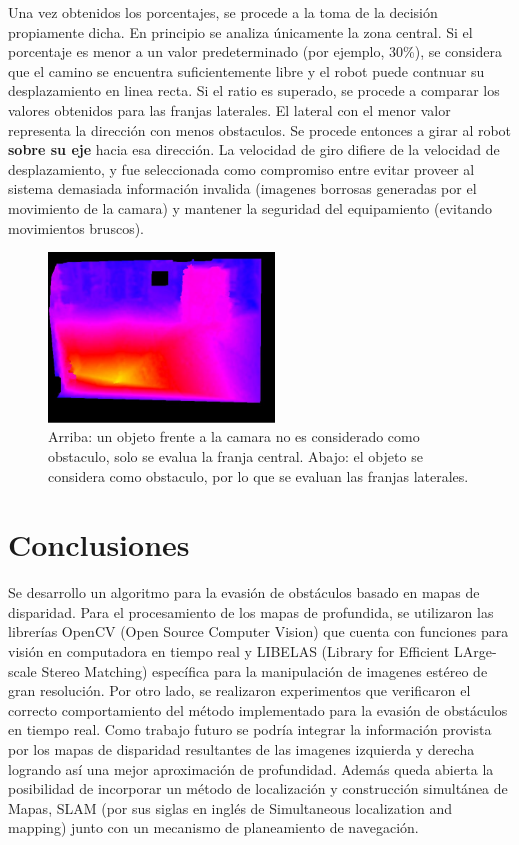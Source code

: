 \documentclass[journal]{IEEEtran}
\begin{document}
Una vez obtenidos los porcentajes, se procede a la toma de la decisi\'on propiamente dicha. En principio se analiza \'unicamente la zona central. Si el porcentaje es menor a un valor predeterminado (por ejemplo, 30\%), se considera que el camino se encuentra suficientemente libre y el robot puede contnuar su desplazamiento en linea recta. Si el ratio es superado, se procede a comparar los valores obtenidos para las franjas laterales. El lateral con el menor valor representa la direcci\'on con menos obstaculos. Se procede entonces a girar al robot {\bf sobre su eje} hacia esa direcci\'on. La velocidad de giro difiere de la velocidad de desplazamiento, y fue seleccionada como compromiso entre evitar proveer al sistema demasiada informaci\'on invalida (imagenes borrosas generadas por el movimiento de la camara) y  mantener la seguridad del equipamiento (evitando movimientos bruscos).
\begin{figure}[ht]
	\begin{center}
		\includegraphics[width=6cm]{./images/disparidad.jpg}
		\caption{Arriba: un objeto frente a la camara no es considerado como obstaculo, solo se evalua la franja central. Abajo: el objeto se considera como obstaculo, por lo que se evaluan las franjas laterales.}
	\end{center}
\end{figure}



\section{Conclusiones}
\label{sec:conclusiones}
Se desarrollo un algoritmo para la evasi\'on de obst\'aculos basado en mapas de disparidad. Para el procesamiento de los mapas de profundida, se utilizaron las librer\'ias OpenCV (Open Source Computer Vision) que cuenta con funciones para visi\'on en computadora en tiempo real y LIBELAS (Library for Efficient LArge-scale Stereo Matching) espec\'ifica para la manipulaci\'on de imagenes est\'ereo de gran resoluci\'on. Por otro lado, se realizaron experimentos que verificaron el correcto comportamiento del m\'etodo implementado para la evasi\'on de obst\'aculos en tiempo real. Como trabajo futuro se podr\'ia integrar la informaci\'on provista por los mapas de disparidad resultantes de las imagenes izquierda y derecha logrando as\'i una mejor aproximaci\'on de profundidad. Adem\'as queda abierta la posibilidad de incorporar un m\'etodo de localizaci\'on y construcci\'on simult\'anea de Mapas, SLAM (por sus siglas en ingl\'es de Simultaneous localization and mapping) junto con un mecanismo de planeamiento de navegaci\'on.
\end{document}
